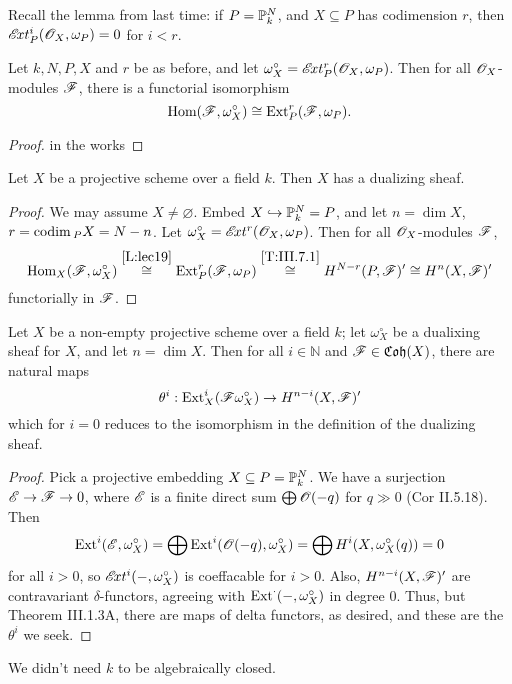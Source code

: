  \setcounter{lecture}{19}

Recall the lemma from last time: if $P=\P^N_k$, and $X\subseteq P$
has codimension $r$, then $\Ext^i_P(\O_X,\omega_P)=0$ for $i<r$.

\begin{lemma}\label{L:lec19} Let $k, N,P, X$ and $r$ be as before,
and let $\omega_X^{\circ}=\Ext^r_P(\O_X,\omega_P)$.  Then for all
$\O_X$-modules $\F$, there is a functorial isomorphism
 \[
    \hom(\F,\omega_X^{\circ})\cong \ext^r_P(\F,\omega_P).
 \]
 \end{lemma}
 \begin{proof}
 in the works
 \end{proof}

 \begin{theorem} Let $X$ be a projective scheme over a field $k$.
 Then $X$ has a dualizing sheaf.
 \end{theorem}
 \begin{proof}
 We may assume $X\not=\varnothing$.  Embed $X\hookrightarrow
 \P^N_k=P$, and let $n=\dim X$, $r=\codim_P X=N-n$.  Let
 $\omega_X^{\circ} = \Ext^r(\O_X,\omega_P)$.  Then for all
 $\O_X$-modules $\F$,
 \[
    \hom_X(\F,\omega_X^{\circ})\stackrel{\ref{L:lec19}}{\cong} \ext^r_P(\F,\omega_P)
    \stackrel{\ref{T:III.7.1}}{\cong} H^{N-r}(P,\F)' \cong H^n(X,\F)'
 \]
 functorially in $\F$.
 \end{proof}

 \begin{theorem}
 Let $X$ be a non-empty projective scheme over a field $k$; let
 $\omega_X^{\circ}$ be a dualixing sheaf for $X$, and let $n=\dim
 X$.  Then for all $i\in \mathbb{N}$ and $\F\in
 \mathfrak{Coh}(X)$, there are natural maps
 \[
    \theta^i:\ext^i_X(\F\omega_X^{\circ})\to H^{n-i}(X,\F)'
 \]
 which for $i=0$ reduces to the isomorphism in the definition of
 the dualizing sheaf.
 \end{theorem}
 \begin{proof}
 Pick a projective embedding $X\subseteq P=\P^N_k$.  We have a
 surjection $\E\to \F\to 0$, where $\E$ is a finite direct sum
 $\bigoplus \O(-q)$ for $q\gg 0$ (Cor II.5.18).  Then
 \[
    \ext^i(\E,\omega_X^{\circ}) = \bigoplus
    \ext^i(\O(-q),\omega_X^{\circ}) = \bigoplus
    H^i(X,\omega_X^{\circ}(q))=0
 \]
 for all $i>0$, so $\Ext^i(-,\omega_X^{\circ})$ is coeffacable for
 $i>0$.  Also, $H^{n-i}(X,\F)'$ are contravariant
 $\delta$-functors, agreeing with
 $\ext^{\cdot}(-,\omega_X^{\circ})$ in degree 0.  Thus, but
 Theorem III.1.3A, there are maps of
 delta functors, as desired, and these are the $\theta^i$ we seek.
 \end{proof}
 \begin{remark}
 We didn't need $k$ to be algebraically closed.
 \end{remark}

